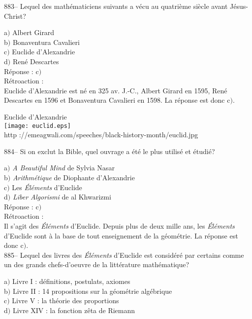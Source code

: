 ﻿\documentclass[letterpaper, 12pt]{article}
\begin{document}
883-- Lequel des math\'ematiciens suivants a v\'ecu au quatri\`eme
si\`ecle avant J\'esus-Christ?

a$)$ Albert Girard \\
b$)$ Bonaventura Cavalieri \\
c$)$ Euclide d'Alexandrie \\
d$)$ Ren\'e Descartes\\

R\'eponse : c$)$\\

R\'etroaction :\\
Euclide d'Alexandrie est n\'e en 325 av. J.-C., Albert Girard en 1595,
Ren\'e Descartes en 1596 et Bonaventura Cavalieri en 1598. La r\'eponse est
donc c$)$.\\

        \begin{center}
        Euclide d'Alexandrie\\
    \texttt{[image: euclid.eps]}\\
        {\footnotesize http
://emeagwali.com/speeches/black-history-month/euclid.jpg}
    \end{center}

884-- Si on exclut la Bible, quel ouvrage a \'et\'e le plus
utilis\'e et \'etudi\'e?

a$)$ {\sl A Beautiful Mind} de Sylvia Nasar \\
b$)$ {\sl Arithm\'etique} de Diophante d'Alexandrie \\
c$)$ Les {\sl \'El\'ements} d'Euclide \\
d$)$ {\sl Liber Algorismi} de al Khwarizmi\\

R\'eponse : c$)$\\

R\'etroaction :\\
Il s'agit des {\sl \'El\'ements} d'Euclide. Depuis plus de deux mille ans,
les {\sl \'El\'ements} d'Euclide sont \`a la base de tout enseignement de la
g\'eom\'etrie. La r\'eponse est donc c$)$.\\

885-- Lequel des livres des {\sl \'El\'ements} d'Euclide est
consid\'er\'e par certains comme un des grands chefs-d'oeuvre de la
litt\'erature math\'ematique?

a$)$ Livre I : d\'efinitions, postulats, axiomes \\
b$)$ Livre II : 14 propositions sur la g\'eom\'etrie alg\'ebrique \\
c$)$ Livre V : la th\'eorie des proportions \\
d$)$ Livre XIV : la fonction z\^eta de Riemann \\
\end{document}
